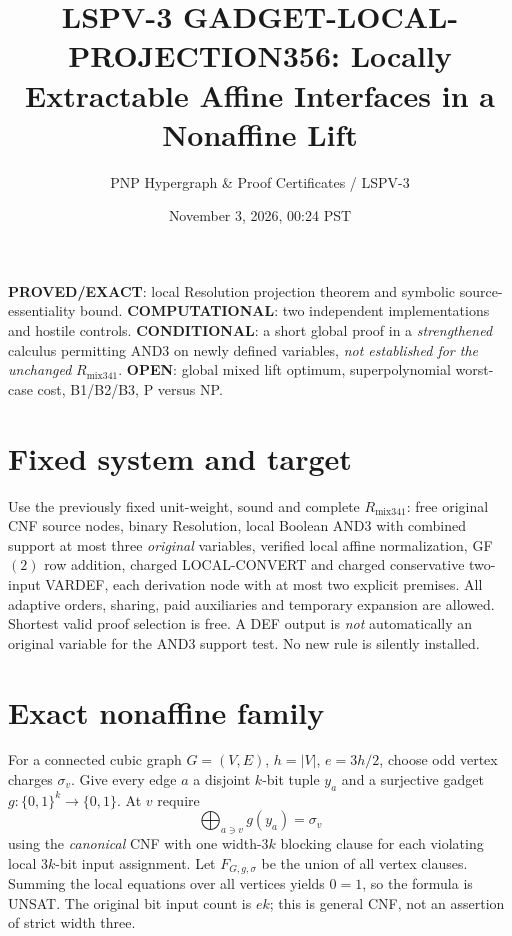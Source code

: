 \documentclass[11pt]{article}
\title{LSPV-3 GADGET-LOCAL-PROJECTION356: Locally Extractable Affine Interfaces in a Nonaffine Lift}
\author{PNP Hypergraph \& Proof Certificates / LSPV-3}
\date{November 3, 2026, 00:24 PST}
\begin{document}
\maketitle
\noindent\textbf{PROVED/EXACT}: local Resolution projection theorem and symbolic source-essentiality bound. \textbf{COMPUTATIONAL}: two independent implementations and hostile controls. \textbf{CONDITIONAL}: a short global proof in a \emph{strengthened} calculus permitting AND3 on newly defined variables, \emph{not established for the unchanged} $R_{\mathrm{mix341}}$. \textbf{OPEN}: global mixed lift optimum, superpolynomial worst-case cost, B1/B2/B3, P versus NP.

\section*{Fixed system and target}
Use the previously fixed unit-weight, sound and complete $R_{\mathrm{mix341}}$: free original CNF source nodes, binary Resolution, local Boolean AND3 with combined support at most three \emph{original} variables, verified local affine normalization, GF$(2)$ row addition, charged LOCAL-CONVERT and charged conservative two-input VARDEF, each derivation node with at most two explicit premises. All adaptive orders, sharing, paid auxiliaries and temporary expansion are allowed. Shortest valid proof selection is free. A DEF output is \emph{not} automatically an original variable for the AND3 support test. No new rule is silently installed.

\section*{Exact nonaffine family}
For a connected cubic graph $G=(V,E)$, $h=|V|$, $e=3h/2$, choose odd vertex charges $\sigma_v$. Give every edge $a$ a disjoint $k$-bit tuple $y_a$ and a surjective gadget $g:\{0,1\}^k\to\{0,1\}$. At $v$ require
\[
\bigoplus_{a\ni v}g(y_a)=\sigma_v
\]
using the \emph{canonical} CNF with one width-$3k$ blocking clause for each violating local $3k$-bit input assignment. Let $F_{G,g,\sigma}$ be the union of all vertex clauses. Summing the local equations over all vertices yields $0=1$, so the formula is UNSAT. The original bit input count is $ek$; this is general CNF, not an assertion of strict width three.
\end{document}
